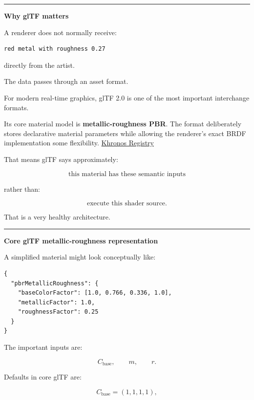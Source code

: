 \hypertarget{03-visual-computing-i-ch006-gltf-gpu-material-representation-scalable-binding-architecture}{}

\begin{center}\rule{0.5\linewidth}{0.5pt}\end{center}

\textbf{Why glTF matters}

A renderer does not normally receive:

\begin{verbatim}
red metal with roughness 0.27
\end{verbatim}

directly from the artist.

The data passes through an asset format.

For modern real-time graphics, glTF 2.0 is one of the most important interchange formats.

Its core material model is \textbf{metallic-roughness PBR}. The format deliberately stores declarative material parameters while allowing the renderer's exact BRDF implementation some flexibility. \href{https://registry.khronos.org/glTF/specs/2.0/glTF-2.0.html?utm_source=chatgpt.com}{Khronos Registry}

That means glTF says approximately:

\[
\text{this material has these semantic inputs}
\]

rather than:

\[
\text{execute this shader source}.
\]

That is a very healthy architecture.

\begin{center}\rule{0.5\linewidth}{0.5pt}\end{center}

\textbf{Core glTF metallic-roughness representation}

A simplified material might look conceptually like:

\begin{verbatim}
{
  "pbrMetallicRoughness": {
    "baseColorFactor": [1.0, 0.766, 0.336, 1.0],
    "metallicFactor": 1.0,
    "roughnessFactor": 0.25
  }
}
\end{verbatim}

The important inputs are:

\[
C_{\text{base}},
\qquad
m,
\qquad
r.
\]

Defaults in core glTF are:

\[
C_{\text{base}}=(1,1,1,1),
\]


